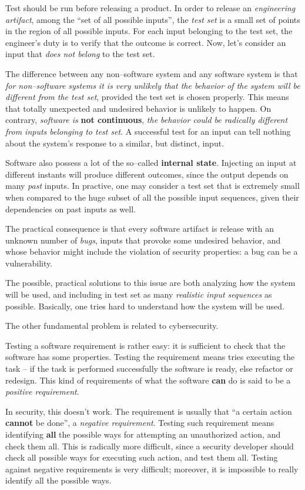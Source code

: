 \documentclass[10pt]{extbook}
\begin{document}
Test should be run before releasing a product. In order to release an
\emph{engineering artifact}, among the ``set of all possible inputs'', the
\emph{test set} is a small set of points in the region of all possible inputs.
For each input belonging to the test set, the engineer's duty is to verify that
the outcome is correct. Now, let's consider an input that \emph{does not
belong} to the test set.

The difference between any non--software system and any software system is that
\emph{for non--software systems it is very unlikely that the behavior of the
system will be different from the test set}, provided the test set is chosen
properly. This means that totally unexpected and undesired behavior is unlikely
to happen. On contrary, \emph{software is }\textbf{not continuous}, \emph{the behavior
could be radically different from inputs belonging to test set}. A successful
test for an input can tell nothing about the system's response to a similar,
but distinct, input.

Software also possess a lot of the so--called \textbf{internal state}.
Injecting an input at different instants will produce different outcomes, since
the output depends on many \emph{past} inputs. In practive, one may consider a
test set that is extremely small when compared to the huge subset of all the
possible input sequences, given their dependencies on past inputs as well.

The practical consequence is that every software artifact is release with an
unknown number of \emph{bugs}, inputs that provoke some undesired behavior, and
whose behavior might include the violation of security properties: a bug can be
a vulnerability.

The possible, practical solutions to this issue are both analyzing how the
system will be used, and including in test set as many \emph{realistic input
sequences} as possible. Basically, one tries hard to understand how the system
will be used.

The other fundamental problem is related to cybersecurity.

Testing a software requirement is rather easy: it is sufficient to check that
the software has some properties. Testing the requirement means tries executing
the task -- if the task is performed successfully the software is ready, else
refactor or redesign. This kind of requirements of what the software
\textbf{can} do is said to be a \emph{positive requirement}.

In security, this doesn't work. The requirement is usually that ``a certain
action \textbf{cannot} be done'', a \emph{negative requirement}. Testing such
requirement means identifying \textbf{all} the possible ways for attempting an
unauthorized action, and check them all. This is radically more difficult,
since a security developer should check all possible ways for executing such
action, and test them all. Testing against negative requirements is very
difficult; moreover, it is impossible to really identify all the possible ways.
\end{document}
